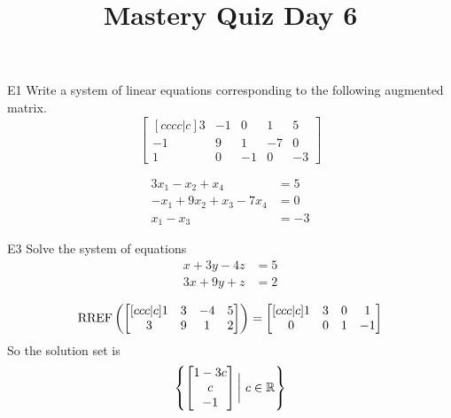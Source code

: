 \documentclass{sbgLAquiz}
\title{Mastery Quiz Day 6 }
\begin{document}
\begin{problem}{E1}
Write a system of linear equations corresponding to the following
augmented matrix.
\[
\begin{bmatrix}[cccc|c]
3 & -1 & 0 & 1 & 5 \\
-1 & 9 & 1 & -7 & 0 \\
1 & 0 & -1 & 0 & -3
\end{bmatrix}
\]
\end{problem}
\begin{solution}
\begin{align*}
3x_1-x_2+x_4 &= 5 \\
-x_1+9x_2+x_3-7x_4 &= 0 \\
x_1-x_3 &= -3
\end{align*}
\end{solution}

\begin{problem}{E3}
Solve the system of equations
\begin{align*}
x+3y-4z &= 5 \\
3x+9y+z &= 2
\end{align*}
\end{problem}
\begin{solution}
$$\operatorname{RREF} \left(\begin{bmatrix}[ccc|c] 1 & 3 & -4 & 5 \\ 3 & 9 & 1 & 2 \end{bmatrix} \right) = \begin{bmatrix}[ccc|c] 1 & 3 & 0 & 1 \\ 0 & 0 & 1 & -1\end{bmatrix}$$
So the solution set is 
$$\left\{ \begin{bmatrix} 1-3c \\ c \\ -1 \end{bmatrix} \bigg|\ c \in \mathbb{R} \right\}$$
\end{solution}
\end{document}
